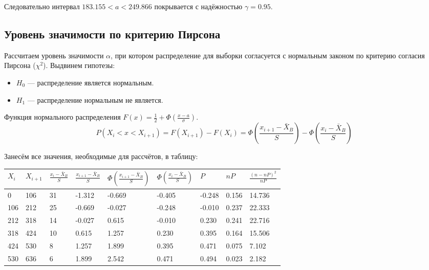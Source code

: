 \documentclass[titlepage]{article}
\begin{document}
Следовательно интервал $183.155 < a < 249.866$ покрывается с надёжностью  $\gamma = 0.95$.

\subsection{Уровень значимости по критерию Пирсона}
Рассчитаем уровень значимости $\alpha$, при котором распределение для выборки согласуется с нормальным законом по критерию согласия Пирсона ($\chi^2$).
Выдвинем гипотезы:

\begin{itemize}
	\item $H_0$ --- распределение является нормальным.
	\item $H_1$ --- распределение нормальным не является.
\end{itemize}

Функция нормального распределения $F (x) = \frac{1}{2} + \Phi(\frac{x - a}{\sigma})$.
\begin{equation*}
P(X_i < x < X_{i+1}) = F(X_{i+1}) - F(X_i) = \Phi \left( \frac{x_{i+1} - \bar{X}_B}{S} \right) - \Phi \left(\frac{x_i - \bar{X}_B}{S} \right)
\end{equation*}

\clearpage
Занесём все значения, необходимые для рассчётов, в таблицу:
\begin{table}[!ht]
    \centering
    \begin{tabular}{|l|l|l|l|l|l|l|l|l|}
    \hline
		$X_i$ & $X_{i+1}$ & $\frac{x_i - \bar{X}_B}{S}$ & $\frac{x_{i+1} - \bar{X}_B}{S}$ & $\Phi \left( \frac{x_{i+1} - \bar{X}_B}{S} \right)$ & $\Phi \left(\frac{x_i - \bar{X}_B}{S} \right)$ & $P$ & $nP$ & $\frac{(n - nP)^2}{nP}$ \\ \hline
		0 & 106 & 31 & -1.312 & -0.669 & -0.405 & -0.248 & 0.156 & 14.736 \\ \hline
		106 & 212 & 25 & -0.669 & -0.027 & -0.248 & -0.010 & 0.237 & 22.333 \\ \hline
		212 & 318 & 14 & -0.027 & 0.615  & -0.010 &  0.230 & 0.241 & 22.716 \\ \hline
		318 & 424 & 10 & 0.615  & 1.257  &  0.230 &  0.395 & 0.164 & 15.506 \\ \hline
		424 & 530 &  8 & 1.257  & 1.899  &  0.395 &  0.471 & 0.075 &  7.102 \\ \hline
		530 & 636 &  6 & 1.899  & 2.542  &  0.471 &  0.494 & 0.023 &  2.182 \\ \hline
    \end{tabular}
\end{table}
\end{document}
